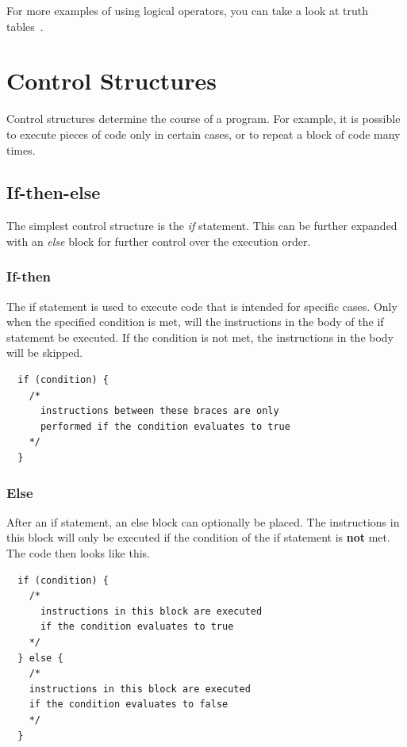 \documentclass[11pt,fleqn]{book} %
\begin{document}
\noindent For more examples of using logical operators, you can take a look at truth tables~\cite{wiki:Truth_table}.


\chapter{Control Structures}
Control structures determine the course of a program. For example, it is possible to execute pieces of code only in certain cases, or to repeat a block of code many times.
\section{If-then-else}
The simplest control structure is the \emph{if} statement. This can be further expanded with an \emph{else} block for further control over the execution order.

\subsection{If-then}
The if statement is used to execute code that is intended for specific cases. Only when the specified condition is met, will the instructions in the body of the if statement be executed. If the condition is not met, the instructions in the body will be skipped.\\

\begin{definition}[If]
	\phantom{ }
	\begin{verbatim}
  if (condition) {
    /*
      instructions between these braces are only
      performed if the condition evaluates to true
    */
  }
	\end{verbatim}
	\vspace{0cm}
\end{definition}

\pagebreak

\subsection{Else}
After an if statement, an else block can optionally be placed. The instructions in this block will only be executed if the condition of the if statement is \textbf{not} met. The code then looks like this.\\

\begin{definition}
	\phantom{ }
	\begin{verbatim}
  if (condition) {
    /*
      instructions in this block are executed
      if the condition evaluates to true
    */
  } else {
    /*
    instructions in this block are executed
    if the condition evaluates to false
    */
  }
	\end{verbatim}
\end{definition}
\end{document}
